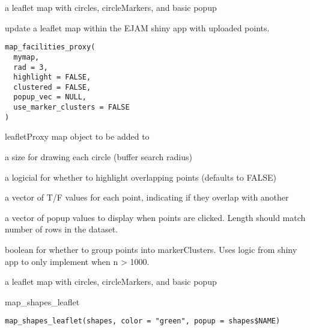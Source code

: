 \documentclass[a4paper]{book}
\begin{document}
%
\begin{Value}
a leaflet map with circles, circleMarkers, and basic popup
\end{Value}
%
\begin{Description}\relax
update a leaflet map within the EJAM shiny app with uploaded points.
\end{Description}
%
\begin{Usage}
\begin{verbatim}
map_facilities_proxy(
  mymap,
  rad = 3,
  highlight = FALSE,
  clustered = FALSE,
  popup_vec = NULL,
  use_marker_clusters = FALSE
)
\end{verbatim}
\end{Usage}
%
\begin{Arguments}
\begin{ldescription}
\item[\code{mymap, }] leafletProxy map object to be added to

\item[\code{rad, }] a size for drawing each circle (buffer search radius)

\item[\code{highlight, }] a logicial for whether to highlight overlapping points (defaults to FALSE)

\item[\code{clustered, }] a vector of T/F values for each point, indicating if they overlap with another

\item[\code{popup\_vec, }] a vector of popup values to display when points are clicked. Length should match number of rows in the dataset.

\item[\code{use\_marker\_clusters, }] boolean for whether to group points into markerClusters. Uses logic from shiny app to only implement when n > 1000.
\end{ldescription}
\end{Arguments}
%
\begin{Value}
a leaflet map with circles, circleMarkers, and basic popup
\end{Value}
%
\begin{Description}\relax
map\_shapes\_leaflet
\end{Description}
%
\begin{Usage}
\begin{verbatim}
map_shapes_leaflet(shapes, color = "green", popup = shapes$NAME)
\end{verbatim}
\end{Usage}
\end{document}
